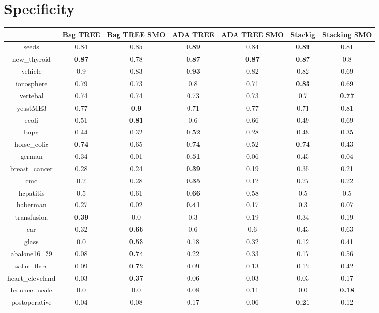 \documentclass{article}%
\begin{document}
\section*{Specificity}%
\begin{tabular}{c|cccccc}%
&Bag TREE&Bag TREE SMO&ADA TREE&ADA TREE SMO&Stackig&Stacking SMO\\%
\hline%
seeds&0.84&0.85&\textbf{0.89}&0.84&\textbf{0.89}&0.81\\%
new\_thyroid&\textbf{0.87}&0.78&\textbf{0.87}&\textbf{0.87}&\textbf{0.87}&0.8\\%
vehicle&0.9&0.83&\textbf{0.93}&0.82&0.82&0.69\\%
ionosphere&0.79&0.73&0.8&0.71&\textbf{0.83}&0.69\\%
vertebal&0.74&0.74&0.73&0.73&0.7&\textbf{0.77}\\%
yeastME3&0.77&\textbf{0.9}&0.71&0.77&0.71&0.81\\%
ecoli&0.51&\textbf{0.81}&0.6&0.66&0.49&0.69\\%
bupa&0.44&0.32&\textbf{0.52}&0.28&0.48&0.35\\%
horse\_colic&\textbf{0.74}&0.65&\textbf{0.74}&0.52&\textbf{0.74}&0.43\\%
german&0.34&0.01&\textbf{0.51}&0.06&0.45&0.04\\%
breast\_cancer&0.28&0.24&\textbf{0.39}&0.19&0.35&0.21\\%
cmc&0.2&0.28&\textbf{0.35}&0.12&0.27&0.22\\%
hepatitis&0.5&0.61&\textbf{0.66}&0.58&0.5&0.5\\%
haberman&0.27&0.02&\textbf{0.41}&0.17&0.3&0.07\\%
transfusion&\textbf{0.39}&0.0&0.3&0.19&0.34&0.19\\%
car&0.32&\textbf{0.66}&0.6&0.6&0.43&0.63\\%
glass&0.0&\textbf{0.53}&0.18&0.32&0.12&0.41\\%
abalone16\_29&0.08&\textbf{0.74}&0.22&0.33&0.17&0.56\\%
solar\_flare&0.09&\textbf{0.72}&0.09&0.13&0.12&0.42\\%
heart\_cleveland&0.03&\textbf{0.37}&0.06&0.03&0.03&0.17\\%
balance\_scale&0.0&0.0&0.08&0.11&0.0&\textbf{0.18}\\%
postoperative&0.04&0.08&0.17&0.06&\textbf{0.21}&0.12\\%
\end{tabular}

%
\end{document}
